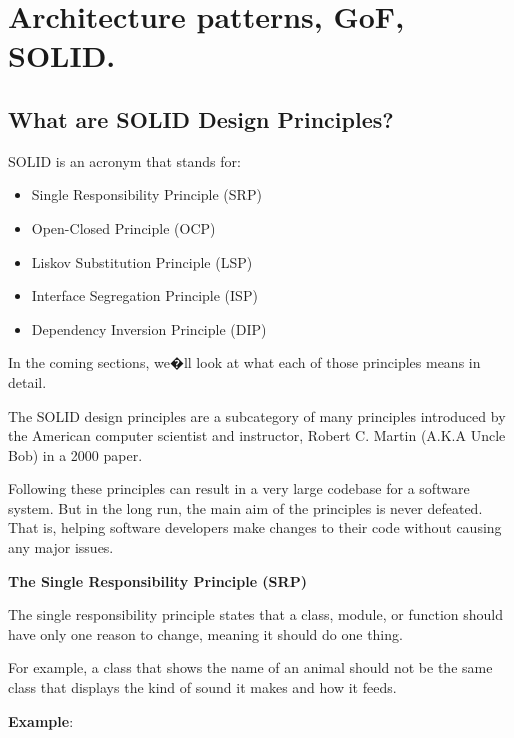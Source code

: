 
\pagebreak
\chapter{Architecture patterns, GoF, SOLID.}

\medskip

\section*{What are SOLID Design Principles?}

SOLID is an acronym that stands for:

\begin{itemize}
\item Single Responsibility Principle (SRP)

\item Open-Closed Principle (OCP)

\item Liskov Substitution Principle (LSP)

\item Interface Segregation Principle (ISP)

\item Dependency Inversion Principle (DIP)
\end{itemize}

In the coming sections, we�ll look at what each of those principles means in detail.

The SOLID design principles are a subcategory of many principles introduced by the American computer scientist and instructor, Robert C. Martin (A.K.A Uncle Bob) in a 2000 paper.

Following these principles can result in a very large codebase for a software system. But in the long run, the main aim of the principles is never defeated. That is, helping software developers make changes to their code without causing any major issues.

\medskip
\begin{center}
\textbf{The Single Responsibility Principle (SRP)}
\end{center}

The single responsibility principle states that a class, module, or function should have only one reason to change, meaning it should do one thing.

For example, a class that shows the name of an animal should not be the same class that displays the kind of sound it makes and how it feeds.

\textbf{Example}:


